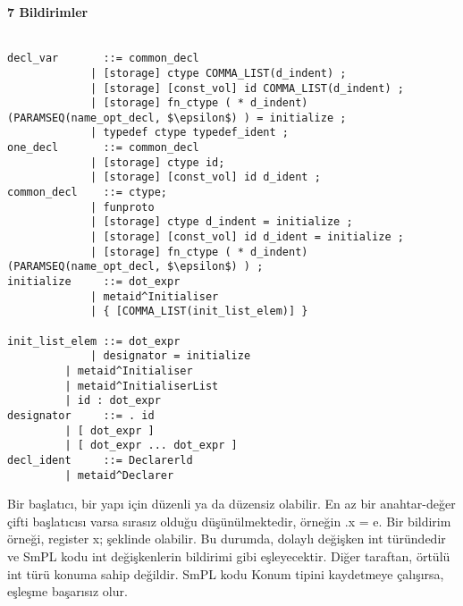 \documentclass[a4paper,22pt, right=2cm]{article}
\begin{document}
\textbf{7 Bildirimler}\\
\\
\begin{lstlisting}[mathescape]
decl_var       ::= common_decl
	         | [storage] ctype COMMA_LIST(d_indent) ;
	         | [storage] [const_vol] id COMMA_LIST(d_indent) ;
	         | [storage] fn_ctype ( * d_indent) (PARAMSEQ(name_opt_decl, $\epsilon$) ) = initialize ;
	         | typedef ctype typedef_ident ;
one_decl       ::= common_decl
	         | [storage] ctype id;
	         | [storage] [const_vol] id d_ident ;
common_decl    ::= ctype;
	         | funproto
	         | [storage] ctype d_indent = initialize ;
	         | [storage] [const_vol] id d_ident = initialize ;
	         | [storage] fn_ctype ( * d_indent) (PARAMSEQ(name_opt_decl, $\epsilon$) ) ;
initialize     ::= dot_expr
	         | metaid^Initialiser
	         | { [COMMA_LIST(init_list_elem)] }

init_list_elem ::= dot_expr
	         | designator = initialize
		 | metaid^Initialiser
		 | metaid^InitialiserList
		 | id : dot_expr
designator     ::= . id
		 | [ dot_expr ]
		 | [ dot_expr ... dot_expr ]
decl_ident     ::= Declarerld
		 | metaid^Declarer
\end{lstlisting}
Bir başlatıcı, bir yapı için düzenli ya da düzensiz olabilir. En az bir anahtar-değer çifti başlatıcısı varsa sırasız olduğu düşünülmektedir, örneğin .x = e.
Bir bildirim örneği, register x; şeklinde olabilir. Bu durumda, dolaylı değişken int türündedir ve SmPL kodu int değişkenlerin bildirimi gibi eşleyecektir. Diğer taraftan, örtülü int türü konuma sahip değildir. SmPL kodu Konum tipini kaydetmeye çalışırsa, eşleşme başarısız olur.
\end{document}
